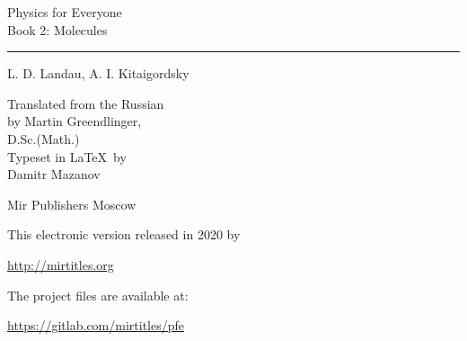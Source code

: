 

\cleardoublepage
\thispagestyle{empty}
\vspace*{1cm}
\begin{center}
\textsf{\Huge Physics for Everyone} \\[10pt] 
\textsf{\huge Book 2: Molecules} \\[10pt]
\hrule
\vspace{10pt}

\textsf{\LARGE L. D. Landau, A. I. Kitaigordsky}\\[15pt]
\begin{flushright}
Translated from the Russian \\by Martin Greendlinger,\\
D.Sc.(Math.)\\[15pt]
Typeset in \LaTeX \, by\\ Damitr Mazanov
\end{flushright}
\vspace{4cm}
\textsf{\Large Mir Publishers Moscow}
\end{center}
\cleardoublepage

\vfill
\vspace*{1cm}
This electronic version released in 2020 by 

\url{http://mirtitles.org}

The project files are available at:

\url{https://gitlab.com/mirtitles/pfe}

\thispagestyle{empty}
\clearpage